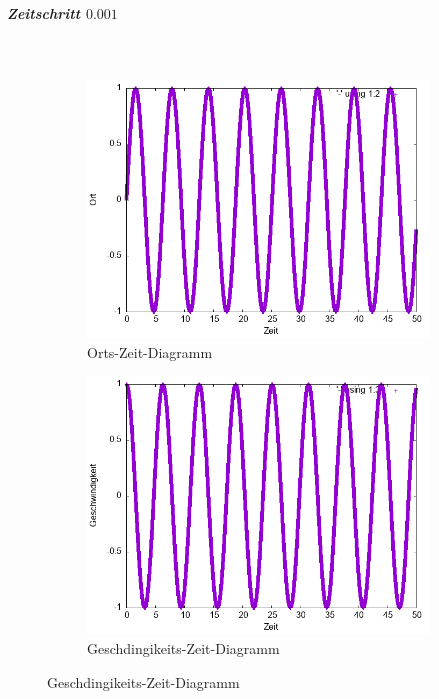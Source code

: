 \documentclass[
    oneside,
    ngerman,
    footinclude=false,
    captions=tableheading,
    DIV=12
]{scrartcl}
\begin{document}
        \subparagraph*{Zeitschritt $0.001$}\,
        \begin{figure}[H]
            \centering
            \begin{subfigure}[b]{0.45\textwidth}
                \centering
                \includegraphics[width=\textwidth]{Bilddateien/expEulerA1(a)-0001-0-x.png}
                \caption{Orts-Zeit-Diagramm}
                \label{fig:expEulerA1(a)-0001-0-x}
            \end{subfigure}
            \hfill
            \begin{subfigure}[b]{0.45\textwidth}
                \centering
                \includegraphics[width=\textwidth]{Bilddateien/expEulerA1(a)-0001-0-v.png}
                \caption{Geschdingikeits-Zeit-Diagramm}
                \label{fig:expEulerA1(a)-0001-0-v}
            \end{subfigure}
        \end{figure}
        
\end{document}
